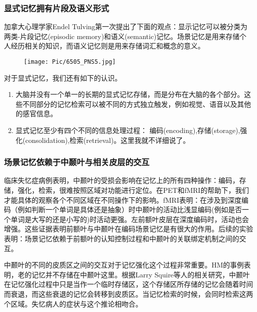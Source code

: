 \documentclass[UTF8,nofonts]{ctexart}
\begin{document}
\subsubsection{显式记忆拥有片段及语义形式}
加拿大心理学家Endel Tulving第一次提出了下面的观点：显示记忆可以被分类为两类-片段记忆(episodic memory)和语义(semantic)记忆。场景记忆是用来存储个人经历相关的知识，而语义记忆则是用来存储词汇和概念的意义。
\begin{figure}[h]
\centering
\texttt{[image: Pic/6505\_PNS5.jpg]}
\end{figure}
对于显式记忆，我们还有如下的认识。
\begin{enumerate}
\item 大脑并没有一个单一的长期的显式记忆存储，而是分布在大脑的各个部分。这些不同部分的记忆检索可以被不同的方式独立触发，例如视觉、语音以及其他的感官信息。
\item 显式记忆至少有四个不同的信息处理过程： 编码(encoding),存储(storage),强化(consolidation),检索(retrieval)。这里我就不详细说了。
\end{enumerate}
\subsubsection{场景记忆依赖于中颞叶与相关皮层的交互}
临床失忆症病例表明，中颞叶的受损会影响在记忆上的所有四种操作：编码，存储，强化，检索，很难按照区域对功能进行定位。在PET和fMRI的帮助下，我们才能具体的观察各个不同区域在不同操作下的影响。fMRI表明：在涉及到深度编码（例如判断一个单词是具体还是抽象）时中颞叶的活动比浅显编码(例如是否一个单词是大写的还是小写的)时活动更强。左前额叶皮层在深度编码时，活动也会增强。这些证据表明前额叶与中颞叶在编码场景记忆是有很大的作用。后续的实验表明：场景记忆依赖于前额叶的认知控制过程和中颞叶的关联绑定机制之间的交互。
\par
中颞叶的不同的皮质区之间的交互对于记忆强化这个过程非常重要。HM的事例表明，老的记忆并不存储在中颞叶这里。根据Larry Squire等人的相关研究，中颞叶在记忆强化过程中只是当作一个临时存储区，这个存储区所存储的记忆会随着时间而衰退，而这些衰退的记忆会转移到皮质区。当记忆检索的时候，会同时检索这两个区域。失忆病人的症状与这个推论相吻合。
\par
\end{document}
